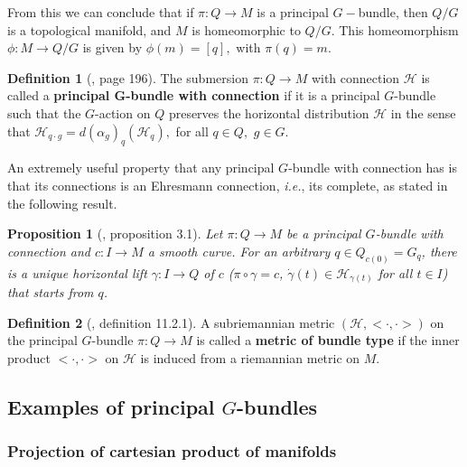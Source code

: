 \documentclass[12pt, letterpaper, reqno]{amsart}
\theoremstyle{definition}
\newtheorem{df}{Definition}
\theoremstyle{plain}
\newtheorem{prop}{Proposition}
\theoremstyle{remark}
\begin{document}
From this we can conclude that if $ \pi: Q \rightarrow M $ is a principal $ G- $bundle, then $Q/G  $ is a topological manifold, and $M $ is homeomorphic to $ Q/G $. This homeomorphism $ \phi: M \rightarrow {Q/G}$  is given by $ \phi(m)=[q], $ with $ \pi(q)=m. $ 

\begin{df}[\cite{montgomery2002tour}, page 196]
	The submersion $ \pi:Q \rightarrow {M}
	$ with connection $ \mathcal{H} $ is called a \textbf{principal $ \mathbf{G} $-bundle with connection} if it is a principal $ G $-bundle such that the $ G $-action on $ Q $ preserves the horizontal distribution $ \mathcal{H} $ in the sense that $ \mathcal{H}_{q\cdot g} = d(\alpha_g)_q (\mathcal{H}_q), $ for all $ q\in Q, $ $ g\in G $.
\end{df}

An extremely useful property that any principal $ G $-bundle with connection has is that its connections is an Ehresmann connection, \textit{i.e.}, its complete, as stated in the following result. 

\begin{prop}[\cite{kobayashi1963foundations}, proposition 3.1]\label{prop:comp_bundle}
	Let $ \pi: Q \rightarrow M $ be a principal $ G $-bundle with connection and $ c: I \rightarrow M $ a smooth curve. For an arbitrary $ q\in Q_{c(0)}= G_q $, there is a unique horizontal lift $ \gamma: I \rightarrow Q $ of $ c $ ($\pi\circ\gamma =c$, $ \dot{\gamma}(t)\in \mathcal{H}_{\gamma(t)} $ for all $ t\in I $) that starts from $ q $.    	
\end{prop}

\begin{df}[\cite{montgomery2002tour}, definition 11.2.1]
	A subriemannian metric $ (\mathcal{H}, <\cdot,\cdot>) $ on the principal $ G $-bundle $ \pi: Q \rightarrow {M}
	 $ is called a \textbf{metric of bundle type} if the inner product $ <\cdot,\cdot> $ on $ \mathcal{H}$ is induced from a riemannian metric on $ M. $ 
\end{df}

\subsection{Examples of principal $ G $-bundles}%
\label{sub:examples_of_principal_g_bundles}

\subsubsection{Projection of cartesian product of manifolds}%
\label{ssub:projection_of_cartesian_product_of_manifolds}
\end{document}
